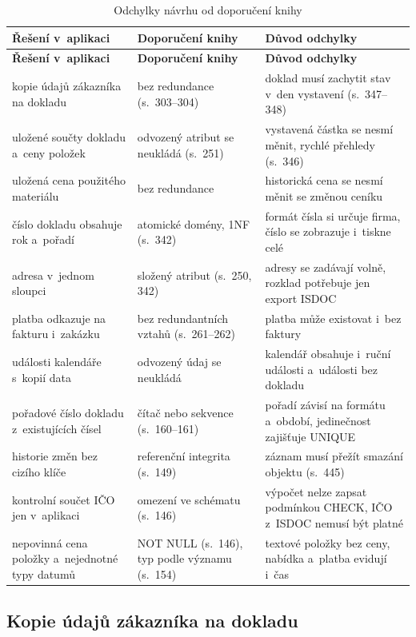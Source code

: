 \begin{longtable}{p{}p{}p{}}
\caption{Odchylky návrhu od doporučení knihy}\label{tab:principy-odchylky}\\
\hline \textbf{Řešení v~aplikaci} & \textbf{Doporučení knihy} & \textbf{Důvod odchylky} \\ \hline\endfirsthead
\hline \textbf{Řešení v~aplikaci} & \textbf{Doporučení knihy} & \textbf{Důvod odchylky} \\ \hline\endhead
kopie údajů zákazníka na dokladu & bez redundance (s.~303--304) & doklad musí zachytit stav v~den vystavení (s.~347--348) \\
uložené součty dokladu a~ceny položek & odvozený atribut se neukládá (s.~251) & vystavená částka se nesmí měnit, rychlé přehledy (s.~346) \\
uložená cena použitého materiálu & bez redundance & historická cena se nesmí měnit se změnou ceníku \\
číslo dokladu obsahuje rok a~pořadí & atomické domény, 1NF (s.~342) & formát čísla si určuje firma, číslo se zobrazuje i~tiskne celé \\
adresa v~jednom sloupci & složený atribut (s.~250, 342) & adresy se zadávají volně, rozklad potřebuje jen export ISDOC \\
platba odkazuje na fakturu i~zakázku & bez redundantních vztahů (s.~261--262) & platba může existovat i~bez faktury \\
události kalendáře s~kopií data & odvozený údaj se neukládá & kalendář obsahuje i~ruční události a~události bez dokladu \\
pořadové číslo dokladu z~existujících čísel & čítač nebo sekvence (s.~160--161) & pořadí závisí na formátu a~období, jedinečnost zajišťuje UNIQUE \\
historie změn bez cizího klíče & referenční integrita (s.~149) & záznam musí přežít smazání objektu (s.~445) \\
kontrolní součet IČO jen v~aplikaci & omezení ve schématu (s.~146) & výpočet nelze zapsat podmínkou CHECK, IČO z~ISDOC nemusí být platné \\
nepovinná cena položky a~nejednotné typy datumů & NOT NULL (s.~146), typ podle významu (s.~154) & textové položky bez ceny, nabídka a~platba evidují i~čas \\
\hline
\end{longtable}

\subsection{Kopie údajů zákazníka na dokladu}

